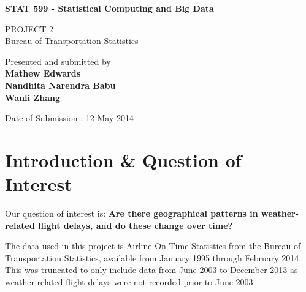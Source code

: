\documentclass{article}
\begin{document}
\begin{titlepage}
    \begin{center}
        \vspace*{1cm}
        
        \Huge
        \textbf{STAT 599 - Statistical Computing and Big Data}
        
        \vspace{1cm}
        \LARGE
        PROJECT 2\\
        Bureau of Transportation Statistics
        
        \vspace{8cm}
        Presented and submitted by \\
        \textbf{Mathew Edwards} \\
        \textbf{Nandhita Narendra Babu} \\
        \textbf{Wanli Zhang}
        
        \vspace{0.5cm}
        Date of Submission : 12 May 2014
        
       
        
    \end{center}
\end{titlepage}


\section{Introduction \& Question of Interest}
Our question of interest is: \textbf{Are there geographical patterns in weather-related flight delays, and do these change over time?}

The data used in this project is Airline On Time Statistics from the Bureau of Transportation Statistics, available from January 1995 through February 2014. This was truncated to only include data from June 2003 to December 2013 as weather-related flight delays were not recorded prior to June 2003. 
\end{document}
